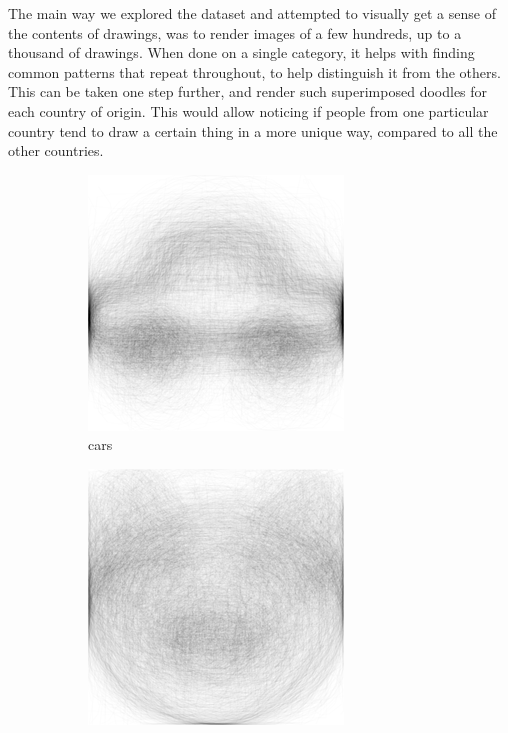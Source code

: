 \documentclass[a4paper, twocolumn]{article}
\begin{document}
The main way we explored the dataset and attempted to visually get a sense of the contents of drawings, was to render images of a few hundreds, up to a thousand of drawings. When done on a single category, it helps with finding common patterns that repeat throughout, to help distinguish it from the others. This can be taken one step further, and render such superimposed doodles for each country of origin. This would allow noticing if people from one particular country tend to draw a certain thing in a more unique way, compared to all the other countries.

    \begin{figure}[H]
    \begin{subfigure}{.33\columnwidth}
      \centering
      \includegraphics[width=.9\textwidth]{figures/car.png}
      \caption{cars}
      \label{fig:cars}
    \end{subfigure}%
    \begin{subfigure}{.33\columnwidth}
      \centering
      \includegraphics[width=.9\textwidth]{figures/pig.png}

\end{subfigure}
\end{figure}
\end{document}

